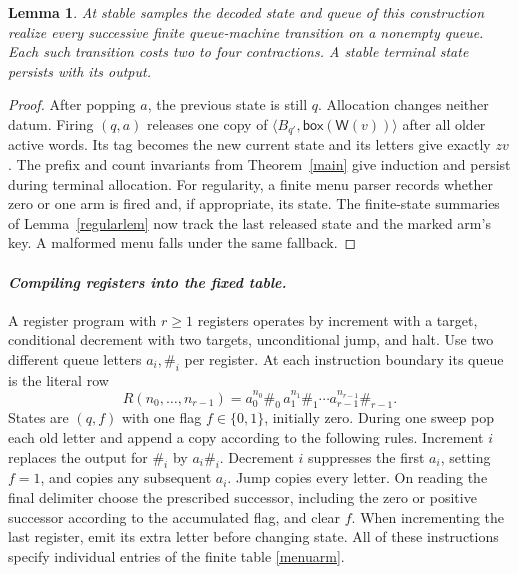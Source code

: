 \documentclass[11pt,letterpaper,oneside,reqno]{amsart}
\newtheorem{lemma}[theorem]{Lemma}
\newcommand{\pair}[2]{\langle #1,#2\rangle}
\newcommand{\word}{\mathsf W}
\newcommand{\bx}[1]{\mathsf{box}(#1)}
\begin{document}
\begin{lemma}\label{queue}
At stable samples the decoded state and queue of this construction realize every successive finite queue-machine transition on a nonempty queue. Each such transition costs two to four contractions. A stable terminal state persists with its output.
\end{lemma}
\begin{proof}
After popping \(a\), the previous state is still \(q\). Allocation changes neither datum. Firing \((q,a)\) releases one copy of \(\pair{B_{q'}}{\bx{\word(v)}}\) after all older active words. Its tag becomes the new current state and its letters give exactly \(zv\). The prefix and count invariants from Theorem~\ref{main} give induction and persist during terminal allocation. For regularity, a finite menu parser records whether zero or one arm is fired and, if appropriate, its state. The finite-state summaries of Lemma~\ref{regularlem} now track the last released state and the marked arm's key. A malformed menu falls under the same fallback.
\end{proof}

\paragraph{\textit{Compiling registers into the fixed table.}}
A register program with \(r\ge1\) registers operates by increment with a target, conditional decrement with two targets, unconditional jump, and halt. Use two different queue letters \(a_i,\#_i\) per register. At each instruction boundary its queue is the literal row
\begin{equation}
       R(n_0,\ldots,n_{r-1})=
       a_0^{n_0}\#_0\,a_1^{n_1}\#_1\cdots a_{r-1}^{n_{r-1}}\#_{r-1}. \label{row}
\end{equation}
States are \((q,f)\) with one flag \(f\in\{0,1\}\), initially zero. During one sweep pop each old letter and append a copy according to the following rules. Increment \(i\) replaces the output for \(\#_i\) by \(a_i\#_i\). Decrement \(i\) suppresses the first \(a_i\), setting \(f=1\), and copies any subsequent \(a_i\). Jump copies every letter. On reading the final delimiter choose the prescribed successor, including the zero or positive successor according to the accumulated flag, and clear \(f\). When incrementing the last register, emit its extra letter before changing state. All of these instructions specify individual entries of the finite table \eqref{menuarm}.
\end{document}
